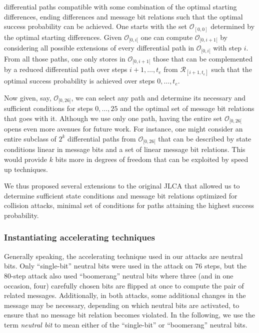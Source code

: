 \begin{enumerate}
differential paths compatible with some combination of the optimal starting differences, ending differences and message bit relations such that the optimal success probability can be achieved.
One starts with the set $\mathcal{O}_{[0,0]}$ determined by the optimal starting differences.
Given $\mathcal{O}_{[0,i[}$ one can compute $\mathcal{O}_{[0,i+1[}$ by considering
all possible extensions of every differential path in $\mathcal{O}_{[0,i[}$ with step $i$.
From all those paths, one only stores in $\mathcal{O}_{[0,i+1[}$ those that can be complemented by a reduced differential path over steps $i+1,\ldots,t_e$ from $\mathcal{R}_{[i+1,t_e]}$ such that the optimal success probability is achieved over steps $0,\ldots,t_e$.

Now given, say, $\mathcal{O}_{[0,26[}$, we can select any path and determine its necessary and sufficient conditions for steps $0,\ldots,25$ and the optimal set of message bit relations that goes with it.
Although we use only one path, having the entire set $\mathcal{O}_{[0,26[}$ opens even more avenues for future work.
For instance, one might consider an entire subclass of $2^k$ differential paths from $\mathcal{O}_{[0,26[}$ that can be described by state conditions linear in message bits and a set of linear message bit relations.
This would provide $k$ bits more in degrees of freedom that can be exploited by speed up techniques.
\end{enumerate}
We thus proposed several extensions to the original JLCA that allowed us to determine sufficient state conditions and message bit relations optimized for collision attacks,
\ie minimal set of conditions for paths attaining the highest success probability.

\subsubsection{Instantiating accelerating techniques}
\label{sec:free_nb}

Generally speaking, the accelerating technique used in our attacks are neutral bits. Only ``single-bit'' neutral bits were used in the attack on 76 steps, but
the 80-step attack also used ``boomerang'' neutral bits where three (and in one occasion, four) carefully chosen bits are flipped at once to compute the
pair of related messages. Additionally, in both attacks, some additional changes in the message may be necessary, depending on which neutral bits are activated,
to ensure that no message bit relation becomes violated. In the following, we use the term \emph{neutral bit} to mean either of the ``single-bit''
or ``boomerang'' neutral bits.

